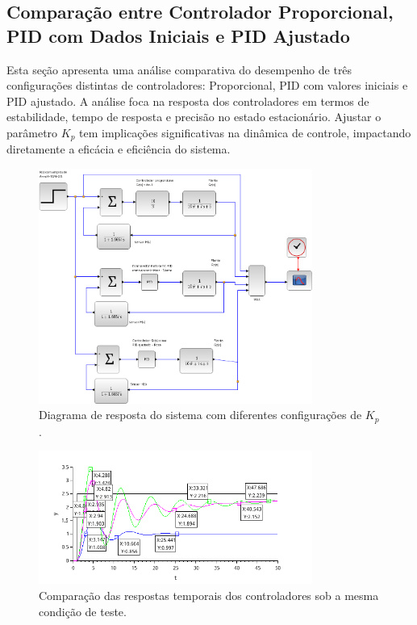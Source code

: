 \subsection{Comparação entre Controlador Proporcional, PID com Dados Iniciais e PID Ajustado}
Esta seção apresenta uma análise comparativa do desempenho de três configurações distintas de controladores: Proporcional, PID com valores iniciais e PID ajustado. A análise foca na resposta dos controladores em termos de estabilidade, tempo de resposta e precisão no estado estacionário. Ajustar o parâmetro \(K_p\) tem implicações significativas na dinâmica de controle, impactando diretamente a eficácia e eficiência do sistema.

\begin{figure}[H]
    \centering
    \includegraphics[width=0.8\textwidth]{atividades/6-atividade/assets/d/diagrama-comparacao-proporcional-pid-pid-ajustado.png}
    \caption{Diagrama de resposta do sistema com diferentes configurações de \(K_p\).}
    \label{fig:diagrama-comparacao-proporcional-pid-pid-ajustado}
\end{figure}

\begin{figure}[H]
    \centering
    \includegraphics[width=0.8\textwidth]{atividades/6-atividade/assets/d/comparacao-proporcional-pid-pid-ajustado.png}
    \caption{Comparação das respostas temporais dos controladores sob a mesma condição de teste.}
    \label{fig:comparacao-proporcional-pid-pid-ajustado}
\end{figure}


